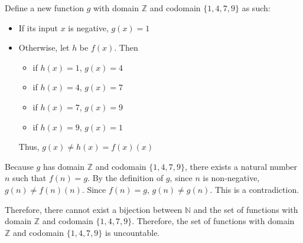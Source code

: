 \documentclass[leqno]{article}
\numberwithin{equation}{section}
\theoremstyle{definition}
\begin{document}
Define a new function $g$ with domain $\mathbb{Z}$ and codomain $\{1, 4, 7, 9\}$ as such:
\begin{itemize}
    \item[] If its input $x$ is negative, $g(x) = 1$
    \item[] Otherwise, let $h$ be $f(x)$. Then
    \begin{itemize}
        \item[] if $h(x) = 1$, $g(x) = 4$
        \item[] if $h(x) = 4$, $g(x) = 7$
        \item[] if $h(x) = 7$, $g(x) = 9$
        \item[] if $h(x) = 9$, $g(x) = 1$
    \end{itemize}
    Thus, $g(x) \neq h(x) = f(x)(x)$
\end{itemize}

Because $g$ has domain $\mathbb{Z}$ and codomain $\{1, 4, 7, 9\}$, there exists a natural number $n$ such that $f(n) = g$. By the definition of $g$, since $n$ is non-negative, $g(n) \neq f(n)(n)$. Since $f(n) = g$, $g(n) \neq g(n)$. This is a contradiction.

Therefore, there cannot exist a bijection between $\mathbb{N}$ and the set of functions with domain $\mathbb{Z}$ and codomain $\{1, 4, 7, 9\}$. Therefore, the set of functions with domain $\mathbb{Z}$ and codomain $\{1, 4, 7, 9\}$ is uncountable.
\end{document}
